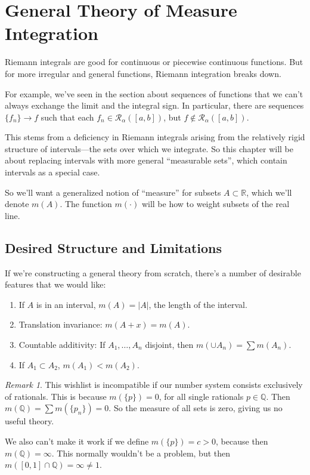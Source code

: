 \documentclass[12pt]{article}
\theoremstyle{plain}
\theoremstyle{definition}
\theoremstyle{remark}
\newtheorem*{rmk}{Remark}
\begin{document}
\newpage
\section{General Theory of Measure Integration}

Riemann integrals are good for continuous or piecewise continuous functions.  But for more irregular and general functions, Riemann integration breaks down.

For example, we've seen in the section about sequences of functions that we can't always exchange the limit and the integral sign. In particular, there are sequences $\{f_n\}\rightarrow f$ such that each $f_n \in \mathscr{R}_\alpha([a,b])$, but $f \not\in \mathscr{R}_\alpha([a,b])$.

This stems from a deficiency in Riemann integrals arising from the relatively rigid structure of intervals---the sets over which we integrate. So this chapter will be about replacing intervals with more general ``measurable sets'', which contain intervals as a special case.

So we'll want a generalized notion of ``measure'' for subsets $A\subset\mathbb{R}$, which we'll denote $m(A)$. The function $m(\cdot)$ will be how to weight subsets of the real line.

\subsection{Desired Structure and Limitations}

If we're constructing a general theory from scratch, there's a number of desirable features that we would like:
\begin{enumerate}
    \item If $A$ is in an interval, $m(A) = |A|$, the length of the interval.
    \item Translation invariance: $m(A+x) = m(A)$.
    \item Countable additivity: If $A_1, \ldots, A_n$ disjoint, then $m(\cup A_n) = \sum m(A_n)$. 
    \item If $A_1 \subset A_2$, $m(A_1) < m(A_2)$.
\end{enumerate}

\begin{rmk}
This wishlist is incompatible if our number system consists exclusively of rationals. This is because $m(\{p\}) = 0$, for all single rationals $p\in\mathbb{Q}$. Then $m(\mathbb{Q})=\sum m(\{p_n\}) = 0$. So the measure of all sets is zero, giving us no useful theory.

We also can't make it work if we define $m(\{p\})=c>0$, because then $m(\mathbb{Q})=\infty$. This normally wouldn't be a problem, but then $m([0,1]\cap \mathbb{Q}) = \infty \neq 1$. 
\end{rmk}
\end{document}
